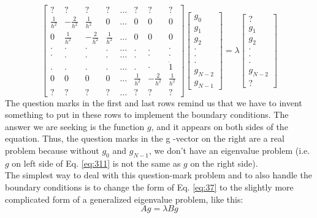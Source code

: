 				\begin{equation}\label{eq:311}
\left[\begin{array}{cccccccc}
? & ? & ? & ? & \ldots & ? & ? & ? \\
\frac{1}{h^{2}} & -\frac{2}{h^{2}} & \frac{1}{h^{2}} & 0 & \ldots & 0 & 0 & 0 \\
0 & \frac{1}{h^{2}} & -\frac{2}{h^{2}} & \frac{1}{h^{2}} & \ldots & 0 & 0 & 0 \\
\cdot & \cdot & \cdot & . & \ldots & . & . & \cdot \\
\cdot & . & . & . & \ldots & . & \cdot & \cdot \\
. & . & . & . & \ldots & . & \cdot & \dot{1} \\
0 & 0 & 0 & 0 & \ldots & \frac{1}{h^{2}} & -\frac{2}{h^{2}} & \frac{1}{h^{2}} \\
? & ? & ? & ? & \ldots & ? & ? & ?
\end{array}\right]\left[\begin{array}{r}
g_{0} \\
g_{1} \\
g_{2} \\
\cdot \\
\cdot \\
\cdot \\
g_{N-2} \\
g_{N-1}
\end{array}\right]=\lambda\left[\begin{array}{r}
? \\
g_{1} \\
g_{2} \\
\cdot \\
\cdot \\
\cdot \\
g_{N-2} \\
?
\end{array}\right]
\end{equation}
The question marks in the first and last rows remind us that we have to invent
something to put in these rows to implement the boundary conditions. The
answer we are seeking is the function $g$, and it appears on both sides of the
equation. Thus, the question marks in the
g -vector on the right are a real problem
because without
$g_0$ and
$g_{N-1}$, we don\rq t have an eigenvalue problem (i.e.
$g$ on left
side of Eq. \eqref{eq:311} is not the same as
$g$ on the right side). \\ 
The simplest way to deal with this question-mark problem and to also handle
the boundary conditions is to change the form of Eq. \eqref{eq:37} to the slightly more
complicated form of a generalized eigenvalue problem, like this:
\begin{equation}\label{eq:312}
		Ag = \lambda Bg
				\end{equation}

